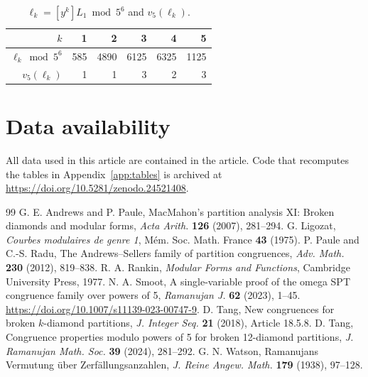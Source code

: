 \documentclass[11pt]{article}
\theoremstyle{definition}
\theoremstyle{remark}
\numberwithin{equation}{section}
\begin{document}
\begin{table}[H]
\centering\small
\caption{$\ell_k=[y^k]L_1\bmod 5^6$ and $v_5(\ell_k)$.}\label{tab:L1}
\begin{tabular}{rrrrrr}
$k$ & 1&2&3&4&5\\\hline
$\ell_k\bmod5^6$ & 585 & 4890 & 6125 & 6325 & 1125 \\
$v_5(\ell_k)$ & 1 & 1 & 3 & 2 & 3 \\
\end{tabular}
\end{table}


\section*{Data availability}
All data used in this article are contained in the article. Code that recomputes the tables in Appendix~\ref{app:tables} is archived at \url{https://doi.org/10.5281/zenodo.24521408}.

\begin{thebibliography}{99}
 G. E. Andrews and P. Paule, MacMahon's partition analysis XI: Broken diamonds and modular forms, \emph{Acta Arith.} \textbf{126} (2007), 281--294.
 G. Ligozat, \emph{Courbes modulaires de genre 1}, M\'em. Soc. Math. France \textbf{43} (1975).
 P. Paule and C.-S. Radu, The Andrews--Sellers family of partition congruences, \emph{Adv. Math.} \textbf{230} (2012), 819--838.
 R. A. Rankin, \emph{Modular Forms and Functions}, Cambridge University Press, 1977.
 N. A. Smoot, A single-variable proof of the omega SPT congruence family over powers of 5, \emph{Ramanujan J.} \textbf{62} (2023), 1--45. \url{https://doi.org/10.1007/s11139-023-00747-9}.
 D. Tang, New congruences for broken $k$-diamond partitions, \emph{J. Integer Seq.} \textbf{21} (2018), Article 18.5.8.
 D. Tang, Congruence properties modulo powers of 5 for broken 12-diamond partitions, \emph{J. Ramanujan Math. Soc.} \textbf{39} (2024), 281--292.
 G. N. Watson, Ramanujans Vermutung \"uber Zerf\"allungsanzahlen, \emph{J. Reine Angew. Math.} \textbf{179} (1938), 97--128.
\end{thebibliography}
\end{document}

